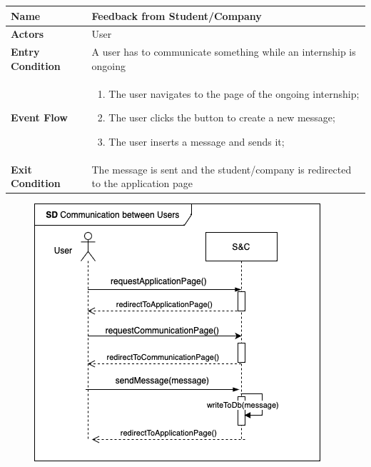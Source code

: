 \begin{enumerate}[label=\textbf{[US\arabic*]}, left = 0pt, align = left, resume]
            \begin{longtable}{|l|p{11cm}|}  
                \hline
                \textbf{Name} & 
                    \textbf{Feedback from Student/Company} \\
                \hline
                
                \textbf{Actors} & 
                    User\\
                \hline
                
                \textbf{Entry Condition} & 
                    A user has to communicate something while an internship is ongoing\\
                \hline
                
                \textbf{Event Flow} &
                    \begin{enumerate}[label=\arabic*., itemsep=0.2em]
                        \item The user navigates to the page of the ongoing internship;
                        \item The user clicks the button to create a new message;
                        \item The user inserts a message and sends it; 
                    \end{enumerate} \\
                \hline
                
                \textbf{Exit Condition} & 
                    The message is sent and the student/company is redirected to the application page \\
                \hline
                \hline
            \end{longtable}

            \begin{figure}[h!]
                \centering        \includegraphics{RASD/Images/UseCases/CommunicationBetweenUsers.drawio.png}
                \label{fig:example}
                \end{figure}
\newpage
    

\end{enumerate}
